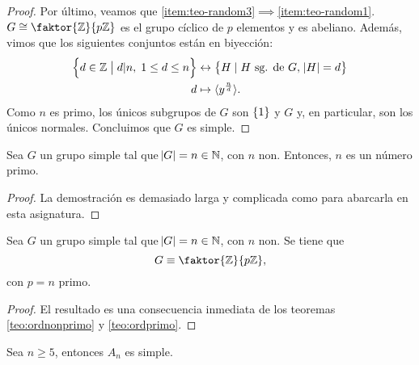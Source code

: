 \begin{proof}
    \noindent Por último, veamos que \ref{item:teo-random3}$\implies$\ref{item:teo-random1}. $G \cong \faktor{\z}{p\z}$ es el grupo cíclico de $p$ elementos y es abeliano.
    Además, vimos que los siguientes conjuntos están en biyección:
    \[
        \begin{aligned}
            \left\{d \in \mathbb{Z} \bigm\vert d \vert n, \; 1 \leq d \leq n \right\} &\leftrightarrow
            \left\{H \mid H \text{ sg. de } G, \; \abs{H} = d\right\} \\
            d &\mapsto \langle y^{\frac{n}{d}} \rangle.
        \end{aligned}
    \]
    Como $n$ es primo, los únicos subgrupos de $G$ son $\left\{1\right\}$ y $G$ y, en particular, son los únicos normales. Concluimos que
    $G$ es simple.
\end{proof}

\begin{teo}\label{teo:ordnonprimo}
    Sea $G$ un grupo simple tal que $\abs{G} = n\in\mathbb{N}$, con $n$ non. Entonces, $n$ es un número primo.
\end{teo}
\begin{proof}
    La demostración es demasiado larga y complicada como para abarcarla en esta asignatura.
\end{proof}
\begin{col}
    Sea $G$ un grupo simple tal que $\abs{G} = n\in\mathbb{N}$, con $n$ non. Se tiene que
    \[
        G \equiv \faktor{\z}{p\z},
    \]
    con $p=n$ primo.
\end{col}
\begin{proof}
    El resultado es una consecuencia inmediata de los teoremas \ref{teo:ordnonprimo} y \ref{teo:ordprimo}.
\end{proof}

\begin{teo*}
    Sea $n \geq 5$, entonces $A_n$ es simple.
\end{teo*}

